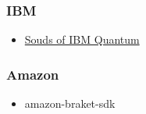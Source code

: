 \documentclass[aspectratio=169]{beamer} %
\begin{document}
\begin{frame}{}
    \frametitle{IBM}
    \begin{itemize}
        \item \href{https://www.youtube.com/watch?v=o-FyH2A7Ed0}{Souds of IBM Quantum}
    \end{itemize}
\end{frame}

\begin{frame}{}
    \frametitle{Amazon}
    \begin{itemize}
        \item amazon-braket-sdk
    \end{itemize}
\end{frame}
\end{document}
